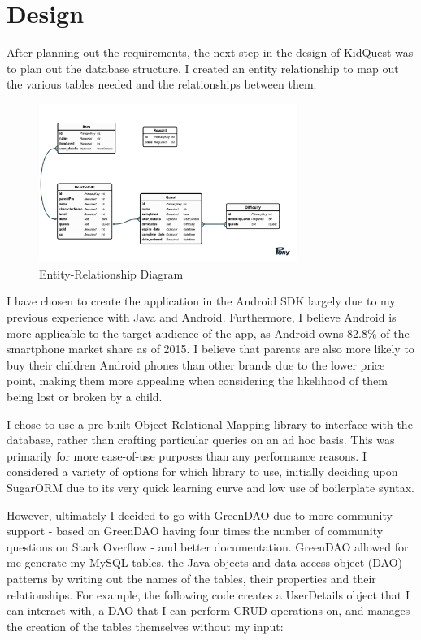 \chapter{Design}

After planning out the requirements, the next step in the design of KidQuest was to plan out the database structure.
I created an entity relationship to map out the various tables needed and the relationships between them.

\begin{figure}[t]
	\centering
	\includegraphics[width=0.75\textwidth]{images/entityRelationshipDiagram.png}
	\caption{Entity-Relationship Diagram}
	\label{fig:ERD}
\end{figure}

I have chosen to create the application in the Android SDK largely due to my previous experience with Java and Android. 
Furthermore, I believe Android is more applicable to the target audience of the app, as Android owns 82.8\% of the smartphone market share as of 2015.
I believe that parents are also more likely to buy their children Android phones than other brands due to the lower price point, making them more appealing when considering the likelihood of them being lost or broken by a child.

I chose to use a pre-built Object Relational Mapping library to interface with the database, rather than crafting particular queries on an ad hoc basis.
This was primarily for more ease-of-use purposes than any performance reasons. 
I considered a variety of options for which library to use, initially deciding upon SugarORM due to its very quick learning curve and low use of boilerplate syntax. 

However, ultimately I decided to go with GreenDAO \citep{greendao} due to more community support - based on GreenDAO having four times the number of community questions on Stack Overflow - and better documentation.
GreenDAO allowed for me generate my MySQL tables, the Java objects and data access object (DAO) patterns by writing out the names of the tables, their properties and their relationships. 
For example, the following code creates a UserDetails object that I can interact with, a DAO that I can perform CRUD operations on, and manages the creation of the tables themselves without my input:


